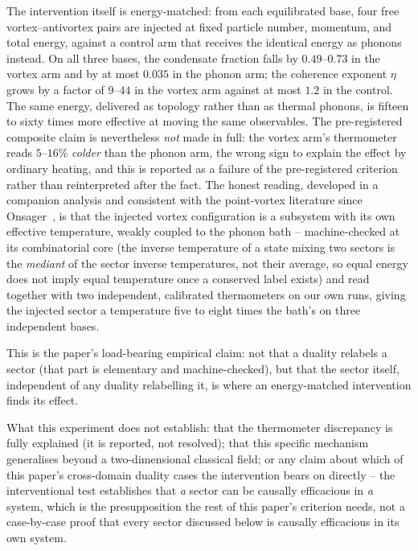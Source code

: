 \documentclass[11pt,a4paper]{article}
\begin{document}
The intervention itself is energy-matched: from each equilibrated base, four free vortex--antivortex
pairs are injected at fixed particle number, momentum, and total energy, against a control arm that
receives the identical energy as phonons instead. On all three bases, the condensate fraction falls by
$0.49$--$0.73$ in the vortex arm and by at most $0.035$ in the phonon arm; the coherence exponent
$\eta$ grows by a factor of $9$--$44$ in the vortex arm against at most $1.2$ in the control. The same
energy, delivered as topology rather than as thermal phonons, is fifteen to sixty times more
effective at moving the same observables. The pre-registered composite claim is nevertheless
\emph{not} made in full: the vortex arm's thermometer reads $5$--$16\%$ \emph{colder} than the phonon
arm, the wrong sign to explain the effect by ordinary heating, and this is reported as a failure of
the pre-registered criterion rather than reinterpreted after the fact. The honest reading, developed
in a companion analysis and consistent with the point-vortex literature since
Onsager~\cite{Callens2026Causal}, is that the injected vortex configuration is a subsystem with its
own effective temperature, weakly coupled to the phonon bath -- machine-checked at its combinatorial
core (the inverse temperature of a state mixing two sectors is the \emph{mediant} of the sector inverse
temperatures, not their average, so equal energy does not imply equal temperature once a conserved
label exists) and read together with two independent, calibrated thermometers on our own runs, giving
the injected sector a temperature five to eight times the bath's on three independent bases.

This is the paper's load-bearing empirical claim: not that a duality relabels a sector (that part is
elementary and machine-checked), but that the sector itself, independent of any duality relabelling
it, is where an energy-matched intervention finds its effect.

\begin{failbox}
What this experiment does not establish: that the thermometer discrepancy is fully explained (it is
reported, not resolved); that this specific mechanism generalises beyond a two-dimensional classical
field; or any claim about which of this paper's cross-domain duality cases the intervention bears on
directly -- the interventional test establishes that \emph{a} sector can be causally efficacious in
\emph{a} system, which is the presupposition the rest of this paper's criterion needs, not a
case-by-case proof that every sector discussed below is causally efficacious in its own system.
\end{failbox}
\end{document}
